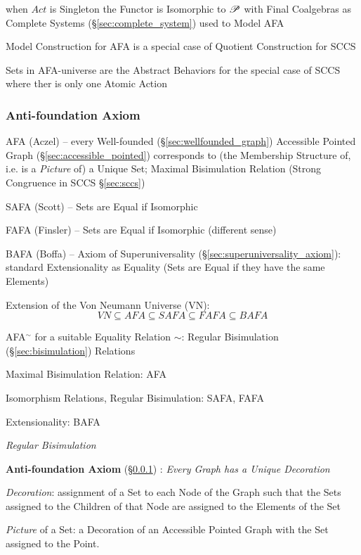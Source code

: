 when $Act$ is Singleton the Functor is Isomorphic to $\mathscr{P}$ with Final
Coalgebras as Complete Systems (\S\ref{sec:complete_system}) used to
Model AFA

Model Construction for AFA is a special case of Quotient Construction
for SCCS

Sets in AFA-universe are the Abstract Behaviors for the special case
of SCCS where ther is only one Atomic Action



\subsubsection{Anti-foundation Axiom}\label{sec:anti_foundation}

\cite{aczel88}

AFA (Aczel) -- every Well-founded (\S\ref{sec:wellfounded_graph})
Accessible Pointed Graph (\S\ref{sec:accessible_pointed}) corresponds
to (the Membership Structure of, i.e. is a \emph{Picture} of) a Unique
Set; Maximal Bisimulation Relation (Strong Congruence in SCCS
\S\ref{sec:sccs})

SAFA (Scott) -- Sets are Equal if Isomorphic

FAFA (Finsler) -- Sets are Equal if Isomorphic (different sense)

BAFA (Boffa) -- Axiom of Superuniversality
(\S\ref{sec:superuniversality_axiom}): standard Extensionality as
Equality (Sets are Equal if they have the same Elements)

Extension of the Von Neumann Universe (VN):
\[
  VN \subseteq AFA \subseteq SAFA \subseteq FAFA \subseteq BAFA
\]

AFA$^\sim$ for a suitable Equality Relation $\sim$: Regular
Bisimulation (\S\ref{sec:bisimulation}) Relations

Maximal Bisimulation Relation: AFA

Isomorphism Relations, Regular Bisimulation: SAFA, FAFA

Extensionality: BAFA

\emph{Regular Bisimulation} %



\textbf{Anti-foundation Axiom} (\S\ref{sec:anti_foundation})
\cite{aczel88}: \emph{Every Graph has a Unique Decoration}

\emph{Decoration}: assignment of a Set to each Node of the Graph such
that the Sets assigned to the Children of that Node are assigned to
the Elements of the Set

\emph{Picture} of a Set: a Decoration of an Accessible Pointed Graph
with the Set assigned to the Point.


